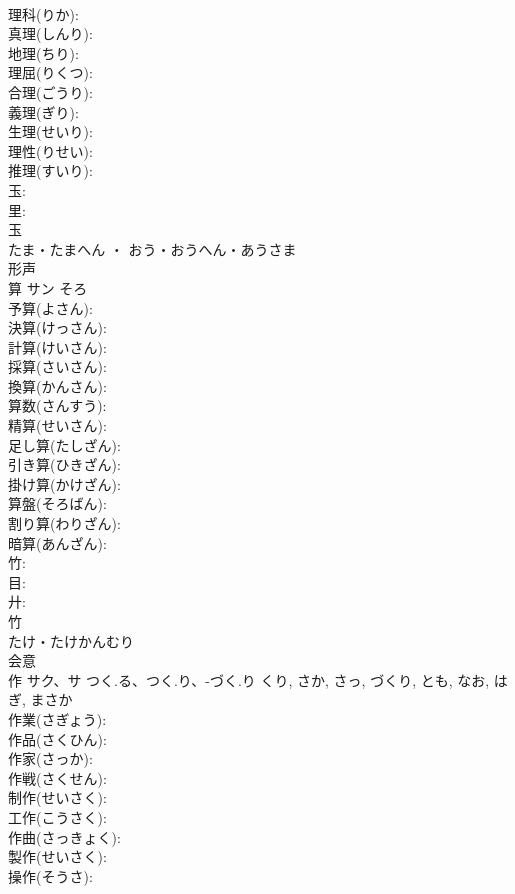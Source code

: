 \documentclass[8pt]{extreport}
\begin{document}
\begin{CJK}{UTF8}{min}
\\	理科(りか): 
\\	真理(しんり): 
\\	地理(ちり): 
\\	理屈(りくつ): 
\\	合理(ごうり): 
\\	義理(ぎり): 
\\	生理(せいり): 
\\	理性(りせい): 
\\	推理(すいり): 
\\	玉: 
\\	里: 
\\	玉	
\\	たま・たまへん ・ おう・おうへん・あうさま	
\\	形声 
\\	算	サン	そろ		
\\	予算(よさん): 
\\	決算(けっさん): 
\\	計算(けいさん): 
\\	採算(さいさん): 
\\	換算(かんさん): 
\\	算数(さんすう): 
\\	精算(せいさん): 
\\	足し算(たしざん): 
\\	引き算(ひきざん): 
\\	掛け算(かけざん): 
\\	算盤(そろばん): 
\\	割り算(わりざん): 
\\	暗算(あんざん): 
\\	竹: 
\\	目: 
\\	廾: 
\\	竹	
\\	たけ・たけかんむり	
\\	会意 
\\	作	サク、サ	つく.る、つく.り、-づく.り	くり, さか, さっ, づくり, とも, なお, はぎ, まさか	
\\	作業(さぎょう): 
\\	作品(さくひん): 
\\	作家(さっか): 
\\	作戦(さくせん): 
\\	制作(せいさく): 
\\	工作(こうさく): 
\\	作曲(さっきょく): 
\\	製作(せいさく): 
\\	操作(そうさ): 

\end{CJK}
\end{document}
